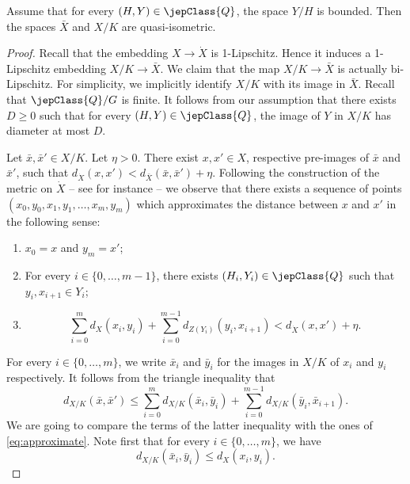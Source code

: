 \begin{proposition}\label{prop:comparison}
Assume that for every $(H,Y)\in\jepClass{Q}$, the space $Y/H$ is bounded. Then the spaces $\bar X$ and $X/K$ are quasi-isometric.
\end{proposition}
\begin{proof}
Recall that the embedding $X\to\dot X$ is 1-Lipschitz. Hence it induces a 1-Lipschitz embedding $X/K\to\bar X$. We claim that the map $X/K\to\bar X$ is actually bi-Lipschitz. For simplicity, we implicitly identify $X/K$ with its image in $\bar X$. Recall that $\jepClass{Q}/G$ is finite. It follows from our assumption that there exists $D\geqslant0$ such that for every $(H,Y)\in\jepClass{Q}$, the image of $Y$ in $X/K$ has diameter at most $D$.

Let $\bar x,\bar x'\in X/K$. Let $\eta>0$. There exist $x,x'\in X$, respective pre-images of $\bar x$ and $\bar x'$, such that $d_{\dot X}(x,x')<d_{\bar X}(\bar x,\bar x')+\eta$. Following the construction of the metric on $\dot X$ -- see for instance \cite[\S5.1]{ref06} -- we observe that there exists a sequence of points $(x_0,y_0,x_1,y_1,\ldots,x_m,y_m)$ which approximates the distance between $x$ and $x'$ in the following sense:
\begin{enumerate}[label=(\roman*)]
\item $x_0=x$ and $y_m=x'$;
\item For every $i\in\{0,\ldots,m-1\}$, there exists $(H_i,Y_i)\in\jepClass{Q}$ such that $y_i,x_{i+1}\in Y_i$;
\item
\begin{equation}\label{eq:approximate}
\sum_{i=0}^m d_X(x_i,y_i)+\sum_{i=0}^{m-1}d_{Z(Y_i)}(y_i,x_{i+1})<d_{\dot X}(x,x')+\eta.
\end{equation}
\end{enumerate}
For every $i\in\{0,\ldots,m\}$, we write $\bar x_i$ and $\bar y_i$ for the images in $X/K$ of $x_i$ and $y_i$ respectively. It follows from the triangle inequality that
\begin{equation}\label{eq:triangle}
d_{X/K}(\bar x,\bar x')\leqslant\sum_{i=0}^m d_{X/K}(\bar x_i,\bar y_i)+\sum_{i=0}^{m-1}d_{X/K}(\bar y_i,\bar x_{i+1}).
\end{equation}
We are going to compare the terms of the latter inequality with the ones of \eqref{eq:approximate}. Note first that for every $i\in\{0,\ldots,m\}$, we have
\begin{equation}\label{eq:firstterms}
d_{X/K}(\bar x_i,\bar y_i)\leqslant d_X(x_i,y_i).

\end{equation}
\end{proof}
